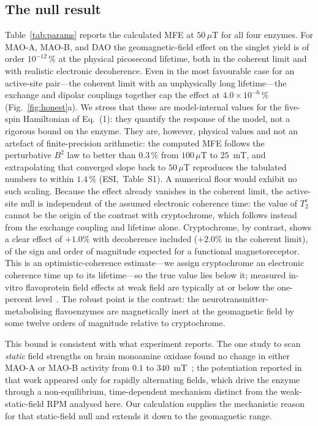 \documentclass[twoside,twocolumn,9pt]{article}
\begin{document}
\subsection{The null result}

Table~\ref{tab:params} reports the calculated MFE at $50\,\mu$T for all four
enzymes. For MAO-A, MAO-B, and DAO the geomagnetic-field effect on the singlet
yield is of order $10^{-12}\,\%$ at the physical picosecond lifetime, both in the
coherent limit and with realistic electronic decoherence. Even in the most
favourable case for an active-site pair---the coherent limit with an unphysically
long lifetime---the exchange and dipolar couplings together cap the effect at
$4.0\times10^{-6}\,\%$ (Fig.~\ref{fig:honest}a). We stress that these are
model-internal values for the five-spin Hamiltonian of Eq.~(1): they quantify the
response of the model, not a rigorous bound on the enzyme. They are, however,
physical values and not an artefact of finite-precision arithmetic: the computed
MFE follows the perturbative $B^2$ law to better than $0.3\,\%$ from $100\,\mu$T
to $25$~mT, and extrapolating that converged slope back to $50\,\mu$T reproduces
the tabulated numbers to within $1.4\,\%$ (ESI,\dag~Table~S1). A numerical floor
would exhibit no such scaling. Because the effect
already vanishes in the coherent limit, the active-site null is independent of
the assumed electronic coherence time: the value of $T_2^e$ cannot be the origin
of the contrast with cryptochrome, which follows instead from the exchange
coupling and lifetime alone. Cryptochrome, by
contrast, shows a clear effect of $+1.0\%$ with decoherence included ($+2.0\%$ in
the coherent limit), of the sign and order of magnitude expected for a functional
magnetoreceptor. This is an optimistic-coherence estimate---we assign
cryptochrome an electronic coherence time up to its lifetime---so the true value
lies below it; measured in-vitro flavoprotein field effects at weak field are
typically at or below the one-percent level~\cite{Maeda2012,Hore2016}. The robust
point is the contrast: the neurotransmitter-metabolising flavoenzymes are
magnetically inert at the geomagnetic field by some twelve orders of magnitude
relative to cryptochrome.

This bound is consistent with what experiment reports. The one study to scan
\emph{static} field strengths on brain monoamine oxidase found no change in
either MAO-A or MAO-B activity from $0.1$ to $340$~mT~\cite{Yokoi2000}; the
potentiation reported in that work appeared only for rapidly alternating fields,
which drive the enzyme through a non-equilibrium, time-dependent mechanism
distinct from the weak-static-field RPM analysed here. Our calculation supplies
the mechanistic reason for that static-field null and extends it down to the
geomagnetic range.
\end{document}
